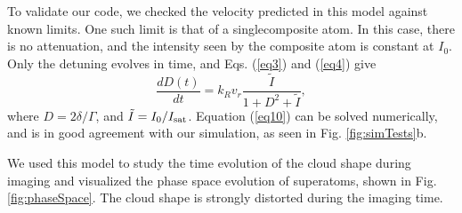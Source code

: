 \documentclass[12pt]{iopart}
\begin{document}
\par To validate our code, we checked the velocity predicted in this model against known limits. One such limit is that of a singlecomposite atom. In this case, there is no attenuation, and the intensity seen by the composite atom is constant at $I_0$. Only the detuning  evolves in time, and Eqs. (\ref{eq3}) and (\ref{eq4}) give
\begin{equation}
\frac{dD(t)}{dt}= k_R v_r \frac{\tilde{I}}{1+D^2+\tilde{I}},
\label{eq10}
\end{equation}
where $D = 2\delta/\Gamma$, and $\tilde{I} = I_0/I_{\rm{sat}}$. Equation (\ref{eq10}) can be solved numerically, and is in good agreement with our simulation, as seen in Fig. \ref{fig:simTests}b.
\par We used this model to study the time evolution of the cloud shape during imaging and visualized the phase space evolution of superatoms, shown in Fig. \ref{fig:phaseSpace}. The cloud shape is strongly distorted during the imaging time. 
\end{document}
